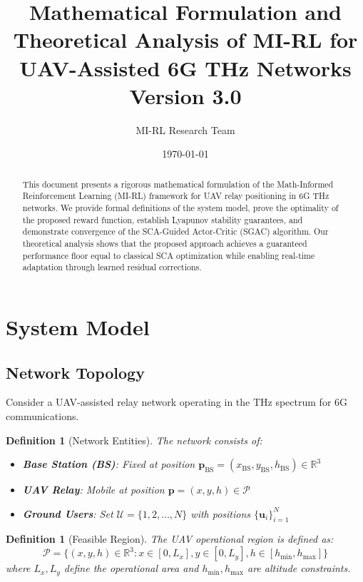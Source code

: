 \documentclass[11pt,a4paper]{article}
\title{\textbf{Mathematical Formulation and Theoretical Analysis of MI-RL for UAV-Assisted 6G THz Networks}\\[0.5em]
\large Version 3.0}
\author{MI-RL Research Team}
\date{\today}
\newtheorem{definition}[theorem]{Definition}
\newcommand{\R}{\mathbb{R}}
\newcommand{\calP}{\mathcal{P}}
\newcommand{\calU}{\mathcal{U}}
\newcommand{\bp}{\mathbf{p}}
\newcommand{\bu}{\mathbf{u}}
\newcommand{\pbs}{\mathbf{p}_{\text{BS}}}
\begin{document}
\maketitle

\begin{abstract}
This document presents a rigorous mathematical formulation of the Math-Informed Reinforcement Learning (MI-RL) framework for UAV relay positioning in 6G THz networks. We provide formal definitions of the system model, prove the optimality of the proposed reward function, establish Lyapunov stability guarantees, and demonstrate convergence of the SCA-Guided Actor-Critic (SGAC) algorithm. Our theoretical analysis shows that the proposed approach achieves a guaranteed performance floor equal to classical SCA optimization while enabling real-time adaptation through learned residual corrections.
\end{abstract}

\tableofcontents
\newpage

\section{System Model}

\subsection{Network Topology}

Consider a UAV-assisted relay network operating in the THz spectrum for 6G communications.

\begin{definition}[Network Entities]
The network consists of:
\begin{itemize}
    \item \textbf{Base Station (BS)}: Fixed at position $\pbs = (x_{\text{BS}}, y_{\text{BS}}, h_{\text{BS}}) \in \R^3$
    \item \textbf{UAV Relay}: Mobile at position $\bp = (x, y, h) \in \calP$
    \item \textbf{Ground Users}: Set $\calU = \{1, 2, \ldots, N\}$ with positions $\{\bu_i\}_{i=1}^N$
\end{itemize}
\end{definition}

\begin{definition}[Feasible Region]
The UAV operational region is defined as:
\begin{equation}
    \calP = \{(x, y, h) \in \R^3 : x \in [0, L_x], y \in [0, L_y], h \in [h_{\min}, h_{\max}]\}
\end{equation}
where $L_x, L_y$ define the operational area and $h_{\min}, h_{\max}$ are altitude constraints.
\end{definition}
\end{document}
